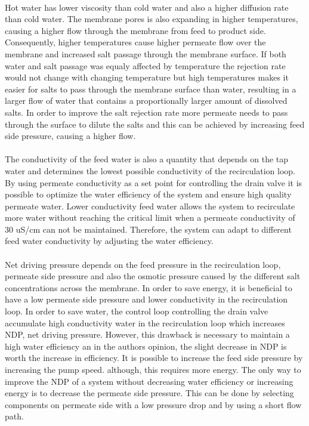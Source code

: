 \\
Hot water has lower viscosity than cold water and also a higher diffusion rate than cold water. The membrane pores is also expanding in higher temperatures, causing a higher flow through the membrane from feed to product side. Consequently, higher temperatures cause higher permeate flow over the membrane and increased salt passage through the membrane surface. If both water and salt passage was equaly affected by temperature the rejection rate would not change with changing temperature but high temperatures makes it easier for salts to pass through the membrane surface than water, resulting in a larger flow of water that contains a proportionally larger amount of dissolved salts. In order to improve the salt rejection rate more permeate needs to pass through the surface to dilute the salts and this can be achieved by increasing feed side pressure, causing a higher flow. \\
\\
The conductivity of the feed water is also a quantity that depends on the tap water and determines the lowest possible conductivity of the recirculation loop. By using permeate conductivity as a set point for controlling the drain valve it is possible to optimize the water efficiency of the system and ensure high quality permeate water. Lower conductivity feed water allows the system to recirculate more water without reaching the critical limit when a permeate conductivity of 30 uS/cm can not be maintained. Therefore, the system can adapt to different feed water conductivity by adjusting the water efficiency.\\
\\
Net driving pressure depends on the feed pressure in the recirculation loop, permeate side pressure and also the osmotic pressure caused by the different salt concentrations across the membrane. In order to save energy, it is beneficial to have a low permeate side pressure and lower conductivity in the recirculation loop. In order to save water, the control loop controlling the drain valve accumulate high conductivity water in the recirculation loop which increases NDP, net driving pressure. However, this drawback is necessary to maintain a high water efficiency an in the authors opinion, the slight decrease in NDP is worth the increase in efficiency. It is possible to increase the feed side pressure by increasing the pump speed. although, this requires more energy. The only way to improve the NDP of a system without decreasing water efficiency or increasing energy is to decrease the permeate side pressure. This can be done by selecting components on permeate side with a low pressure drop and by using a short flow path.

